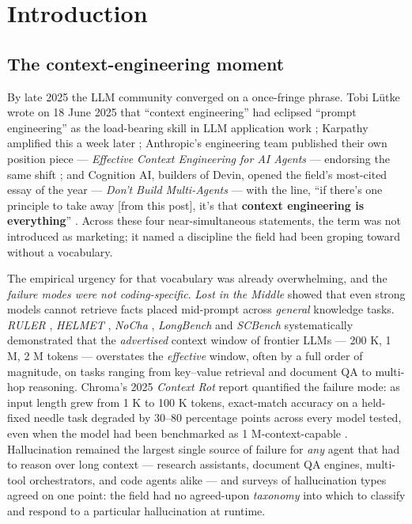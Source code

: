 \section{Introduction}\label{introduction}

\subsection{The context-engineering moment}\label{the-context-engineering-moment}

By late 2025 the LLM community converged on a once-fringe phrase. Tobi Lütke wrote on 18 June 2025 that ``context engineering'' had eclipsed ``prompt engineering'' as the load-bearing skill in LLM application work \citep{lutke2025contexteng}; Karpathy amplified this a week later \citep{karpathy2025contexteng}; Anthropic's engineering team published their own position piece --- \emph{Effective Context Engineering for AI Agents} --- endorsing the same shift \citep{anthropic2025contexteng}; and Cognition AI, builders of Devin, opened the field's most-cited essay of the year --- \emph{Don't Build Multi-Agents} --- with the line, ``if there's one principle to take away {[}from this post{]}, it's that \textbf{context engineering is everything}'' \citep{yan2025dontbuild}. Across these four near-simultaneous statements, the term was not introduced as marketing; it named a discipline the field had been groping toward without a vocabulary.

The empirical urgency for that vocabulary was already overwhelming, and the \emph{failure modes were not coding-specific}. \emph{Lost in the Middle} \citep{liu2023lostmiddle} showed that even strong models cannot retrieve facts placed mid-prompt across \emph{general} knowledge tasks. \emph{RULER} \citep{hsieh2024ruler}, \emph{HELMET} \citep{yen2024helmet}, \emph{NoCha} \citep{karpinska2024nocha}, \emph{LongBench} \citep{bai2024longbench} and \emph{SCBench} \citep{wu2024scbench} systematically demonstrated that the \emph{advertised} context window of frontier LLMs --- 200 K, 1 M, 2 M tokens --- overstates the \emph{effective} window, often by a full order of magnitude, on tasks ranging from key--value retrieval and document QA to multi-hop reasoning. Chroma's 2025 \emph{Context Rot} report quantified the failure mode: as input length grew from 1 K to 100 K tokens, exact-match accuracy on a held-fixed needle task degraded by 30--80 percentage points across every model tested, even when the model had been benchmarked as 1 M-context-capable \citep{hong2025contextrot}. Hallucination remained the largest single source of failure for \emph{any} agent that had to reason over long context --- research assistants, document QA engines, multi-tool orchestrators, and code agents alike \citep{ji2023hallusurvey, huang2024hallucinationsurvey, jimenez2024swebench, openai2024sweverified} --- and surveys of hallucination types agreed on one point: the field had no agreed-upon \emph{taxonomy} into which to classify and respond to a particular hallucination at runtime.

